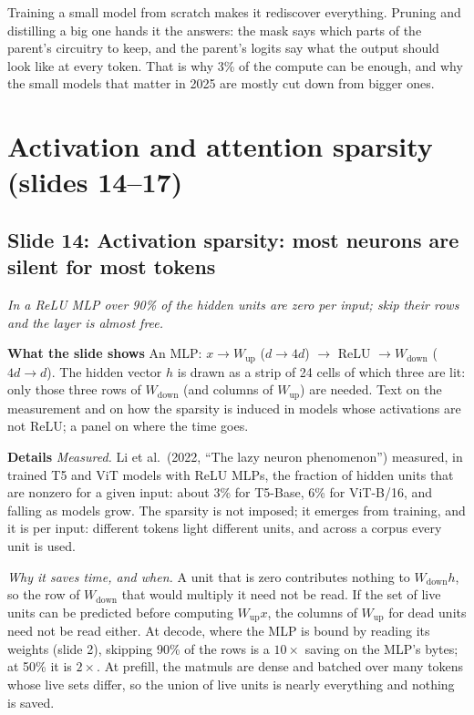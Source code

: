 \documentclass[11pt,letterpaper]{article}
\newcommand{\setstage}[1]{\colorlet{stagec}{#1}}
\newcommand{\slide}[3]{%
  \subsection[Slide #1: #2]{Slide #1: #2}%
  {\color{muted}\itshape #3\par}\medskip}
\newcommand{\para}[1]{\medskip\noindent\textbf{#1}\quad}
\newenvironment{intuition}{\begin{tcolorbox}[intuitionbox]}{\end{tcolorbox}}
\begin{document}
\begin{intuition}
Training a small model from scratch makes it rediscover everything. Pruning and distilling a big one hands it the answers: the mask says which parts of the parent's circuitry to keep, and the parent's logits say what the output should look like at every token. That is why 3\% of the compute can be enough, and why the small models that matter in 2025 are mostly cut down from bigger ones.
\end{intuition}

\clearpage
\setstage{emb}
\section{Activation and attention sparsity (slides 14--17)}

\slide{14}{Activation sparsity: most neurons are silent for most tokens}{In a ReLU MLP over 90\% of the hidden units are zero per input; skip their rows and the layer is almost free.}

\para{What the slide shows} An MLP: $x\to W_{\text{up}}$ ($d\to4d$) $\to$ ReLU $\to W_{\text{down}}$ ($4d\to d$). The hidden vector $h$ is drawn as a strip of 24 cells of which three are lit: only those three rows of $W_{\text{down}}$ (and columns of $W_{\text{up}}$) are needed. Text on the measurement and on how the sparsity is induced in models whose activations are not ReLU; a panel on where the time goes.

\para{Details} \emph{Measured.} Li et al.\ (2022, ``The lazy neuron phenomenon'') measured, in trained T5 and ViT models with ReLU MLPs, the fraction of hidden units that are nonzero for a given input: about 3\% for T5-Base, 6\% for ViT-B/16, and falling as models grow. The sparsity is not imposed; it emerges from training, and it is per input: different tokens light different units, and across a corpus every unit is used.

\emph{Why it saves time, and when.} A unit that is zero contributes nothing to $W_{\text{down}}h$, so the row of $W_{\text{down}}$ that would multiply it need not be read. If the set of live units can be predicted before computing $W_{\text{up}}x$, the columns of $W_{\text{up}}$ for dead units need not be read either. At decode, where the MLP is bound by reading its weights (slide 2), skipping 90\% of the rows is a $10\times$ saving on the MLP's bytes; at 50\% it is $2\times$. At prefill, the matmuls are dense and batched over many tokens whose live sets differ, so the union of live units is nearly everything and nothing is saved.
\end{document}

